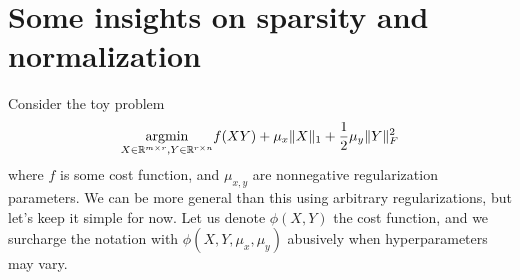 \documentclass[a4paper, 11pt]{article}
\begin{document}
\section{Some insights on sparsity and normalization}

Consider the toy problem
\begin{equation}\label{eq:toypb}
  \underset{X\in\mathbb{R}^{m\times r},Y\in\mathbb{R}^{r\times n}}{\mathop{\text{~argmin~}}}f(XY) + \mu_x \|X\|_1 + \frac{1}{2}\mu_y \|Y\|_F^2
\end{equation}
where \( f \) is some cost function, and \( \mu_{x,y} \) are nonnegative regularization parameters. We can be more general than this using arbitrary regularizations, but let's keep it simple for now. Let us denote \( \phi(X,Y) \) the cost function, and we surcharge the notation with \( \phi(X,Y,\mu_x,\mu_y) \) abusively when hyperparameters may vary.
\end{document}
